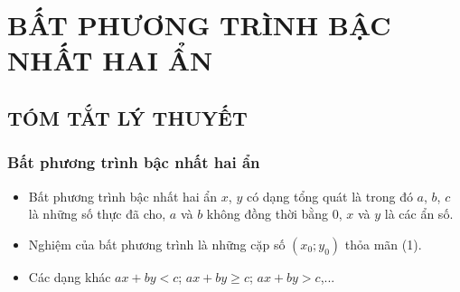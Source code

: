 \section{BẤT PHƯƠNG TRÌNH BẬC NHẤT HAI ẨN}

\subsection{TÓM TẮT LÝ THUYẾT}
\subsubsection{Bất phương trình bậc nhất hai ẩn}
\begin{itemize}
	\item [\iconMT] Bất phương trình bậc nhất hai ẩn $x$, $y$ có dạng tổng quát là 
	trong đó $a$, $b$, $c$ là những số thực đã cho, $a$ và $b$ không đồng thời bằng $0$, $x$ và $y$ là các ẩn số.
	\item [\iconMT] Nghiệm của bất phương trình là những cặp số $(x_0;y_0)$ thỏa mãn (1).
	\item [\iconMT] Các dạng khác $ax+by<c$; $ax+by\ge c$; $ax+by>c$,...
\end{itemize}

